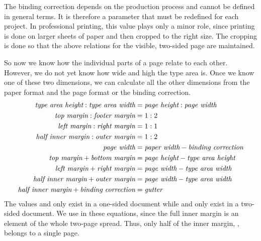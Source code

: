 \begin{Explain}
  The binding correction depends on the production process and cannot be
  defined in general terms. It is therefore a parameter that must be redefined
  for each project. In professional printing, this value plays only a minor
  role, since printing is done on larger sheets of paper and then cropped to
  the right size. The cropping is done so that the above relations for the
  visible, two-sided page are maintained.

  So now we know how the individual parts of a page relate to each other.
  However, we do not yet know how wide and high the type area is. Once we know
  one of these two dimensions, we can calculate all the other dimensions from
  the paper format and the page format or the binding correction.
  \begin{align*}
    \Var{type~area~height}\Index{type area} : \Var{type~area~width} &=
    \Var{page~height}\Index{page} : \Var{page~width}\\
    \Var{top~margin}\Index{margin} : \Var{footer~margin} &=
      \text{1} : \text{2} \\
%
    \Var{left~margin} : \Var{right~margin} &=  \text{1} : \text{1} \\
%
    \Var{half~inner~margin} : \Var{outer~margin} &= \text{1} : \text{2} \\
%
   \Var{page~width} &= 
      \Var{paper~width}\Index{paper} - 
      \Var{binding~correction}\Index{binding correction}\\
%
    \Var{top~margin} + \Var{bottom~margin} &=
    \Var{page~height} - \Var{type~area~height} \\
%
    \Var{left~margin} + \Var{right~margin} &=
    \Var{page~width} - \Var{type~area~width} \\
%
    \Var{half~inner~margin} + \Var{outer~margin} &=
    \Var{page~width} - \Var{type~area~width} \\
%
    \Var{half~inner~margin} + \Var{binding~correction} &=
    \Var{gutter}\Index{gutter}
  \end{align*}
  The values  and  only exist in a
  one-sided document while  and  only
  exist in a two-sided document. We use  in these
  equations, since the full inner margin is an element of the whole two-page
  spread. Thus, only half of the inner margin, ,
  belongs to a single page.


\end{Explain}
